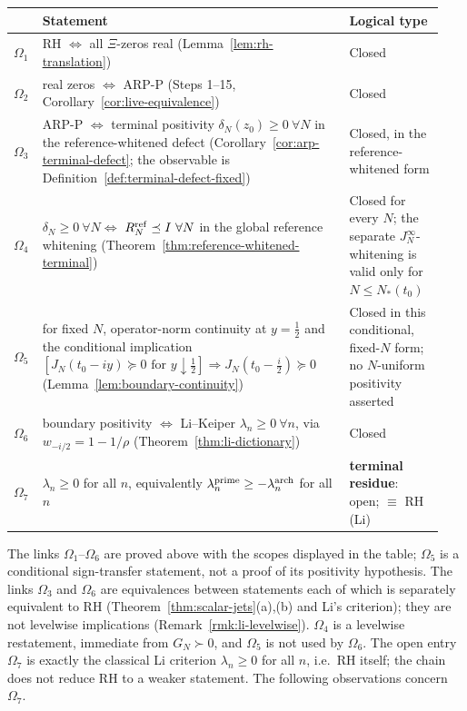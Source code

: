 \documentclass[11pt]{amsart}
\theoremstyle{definition}
\theoremstyle{remark}
\theoremstyle{definition}
\newcommand{\half}{\tfrac{1}{2}}
\begin{document}
\begin{center}
\small
\renewcommand{\arraystretch}{1.3}
\begin{tabular}{@{}p{0.05\linewidth}p{0.68\linewidth}p{0.21\linewidth}@{}}
\toprule
& Statement & Logical type\\\midrule
$\Omega_1$ & RH $\Longleftrightarrow$ all $\Xi$-zeros real (Lemma~\ref{lem:rh-translation}) & Closed\\
$\Omega_2$ & real zeros $\Longleftrightarrow$ ARP-P (Steps 1--15, Corollary~\ref{cor:live-equivalence}) & Closed\\
$\Omega_3$ & ARP-P $\Longleftrightarrow$ terminal positivity $\delta_N(z_0)\ge0\ \forall N$ in the
reference-whitened defect (Corollary~\ref{cor:arp-terminal-defect}; the observable is
Definition~\ref{def:terminal-defect-fixed}) & Closed, in the reference-whitened form\\
$\Omega_4$ & $\delta_N\ge0\ \forall N\Longleftrightarrow$
$R_N^{\rm ref}\preceq I\ \forall N$ in the global reference whitening
(Theorem~\ref{thm:reference-whitened-terminal}) & Closed for every $N$; the separate
$J_N^\infty$-whitening is valid only for $N\le N_*(t_0)$\\
$\Omega_5$ & for fixed $N$, operator-norm continuity at $y=\half$ and the conditional implication
$[J_N(t_0-iy)\succeq0\text{ for }y\downarrow\half]\Rightarrow
J_N(t_0-\tfrac i2)\succeq0$ (Lemma~\ref{lem:boundary-continuity}) & Closed in this conditional,
fixed-$N$ form; no $N$-uniform positivity asserted\\
$\Omega_6$ & boundary positivity $\Longleftrightarrow$ Li--Keiper $\lambda_n\ge0\ \forall n$, via
$w_{-i/2}=1-1/\rho$ (Theorem~\ref{thm:li-dictionary}) & Closed\\
$\Omega_7$ & $\lambda_n\ge0$ for all $n$, equivalently
$\lambda_n^{\rm prime}\ge-\lambda_n^{\rm arch}$ for all $n$ & \textbf{terminal residue}: open;
$\equiv$ RH (Li)\\
\bottomrule
\end{tabular}
\end{center}

The links $\Omega_1$--$\Omega_6$ are proved above with the scopes displayed in the table; $\Omega_5$
is a conditional sign-transfer statement, not a proof of its positivity hypothesis.  The links
$\Omega_3$ and $\Omega_6$ are equivalences between statements each of which is separately
equivalent to RH (Theorem~\ref{thm:scalar-jets}(a),(b) and Li's criterion); they are not levelwise
implications (Remark~\ref{rmk:li-levelwise}).  $\Omega_4$ is a levelwise restatement, immediate from
$G_N\succ0$, and $\Omega_5$ is not used by $\Omega_6$.  The open entry
$\Omega_7$ is exactly the classical Li criterion $\lambda_n\ge0$ for all $n$, i.e.\ RH itself; the
chain does not reduce RH to a weaker statement.  The following observations concern $\Omega_7$.
\end{document}
